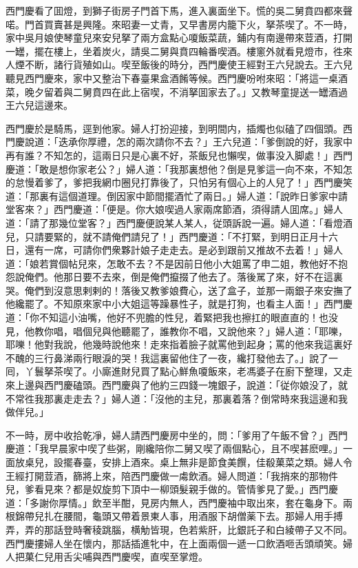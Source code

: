 西門慶看了囬燈，到獅子街房子門首下馬，進入裏面坐下。慌的吳二舅賁四都來聲喏。門首買賣甚是興隆。來昭妻一丈青，又早書房内籠下火，拏茶喫了。不一時，家中吳月娘使琴童兒來安兒拏了兩方盒點心嗄飯菜蔬，鋪内有南邊帶來荳酒，打開一罎，擺在樓上，坐着炭火，請吳二舅與賁四輪番喫酒。樓窻外就看見燈巿，徃來人煙不断，諸行貨殖如山。喫至飯後的時分，西門慶使王經對王六兒說去。王六兒聽見西門慶來，家中又整治下春臺果盒酒餚等候。西門慶吩咐來昭：「將這一桌酒菜，晚夕留着與二舅賁四在此上宿喫，不消拏囬家去了。」又教琴童提送一罎酒過王六兒這邊來。

西門慶於是騎馬，逕到他家。婦人打扮迎接，到明間内，插燭也似磕了四個頭。西門慶說道：「迭承你厚禮，怎的兩次請你不去？」王六兒道：「爹倒說的好，我家中再有誰？不知怎的，這兩日只是心裏不好，茶飯兒也懶喫，做事没入脚處！」西門慶道：「敢是想你家老公？」婦人道：「我那裏想他？倒是見爹這一向不來，不知怎的怠慢着爹了，爹把我網巾圈兒打靠後了，只怕另有個心上的人兒了！」西門慶笑道：「那裏有這個道理。倒因家中節間擺酒忙了兩日。」婦人道：「說昨日爹家中請堂客來？」西門慶道：「便是。你大娘喫過人家兩席節酒，須得請人囬席。」婦人道：「請了那幾位堂客？」西門慶便說某人某人，従頭訴說一遍。婦人道：「看燈酒兒，只請要緊的，就不請俺們請兒了！」西門慶道：「不打緊，到明日正月十六日，還有一席，可請你們衆夥計娘子走走去。是必到跟前又推故不去着！」婦人道：「娘若賞個帖兒來，怎敢不去？不是因前日他小大姐罵了申二姐，教他好不抱怨說俺們。他那日要不去來，倒是俺們攛掇了他去了。落後駡了來，好不在這裏哭。俺們到沒意思剌剌的！落後又教爹娘費心，送了盒子，並那一兩銀子來安撫了他纔罷了。不知原來家中小大姐這等躁暴性子，就是打狗，也看主人面！」西門慶道：「你不知這小油嘴，他好不兜膽的性兒，着緊把我也擦扛的眼直直的！也没見，他教你唱，唱個兒與他聽罷了，誰教你不唱，又說他來？」婦人道：「耶嚛，耶嚛！他對我說，他幾時說他來！走來指着臉子就罵他到起身；罵的他來我這裏好不醜的三行鼻涕兩行眼淚的哭！我這裏留他住了一夜，纔打發他去了。」說了一囘，丫鬟拏茶喫了。小廝進財兒買了點心鮮魚嗄飯來，老馮婆子在廚下整理，又走來上邊與西門慶磕頭。西門慶與了他約三四錢一塊銀子，說道：「従你娘没了，就不常徃我那裏走走去？」婦人道：「沒他的主兒，那裏着落？倒常時來我這邊和我做伴兒。」

不一時，房中收拾乾凈，婦人請西門慶房中坐的，問：「爹用了午飯不曾？」西門慶道：「我早晨家中喫了些粥，剛纔陪你二舅又喫了兩個點心，且不喫甚麽哩。」一面放桌兒，設擺春臺，安排上酒來。桌上無非是節食美饌，佳殽菓菜之類。婦人令王經打開荳酒，篩將上來，陪西門慶做一䖏飲酒。婦人問道：「我捎來的那物件兒，爹看見來？都是奴旋剪下頂中一柳頭髮親手做的。管情爹見了愛。」西門慶道：「多謝你厚情。」飲至半酣，見房内無人，西門慶袖中取出來，套在龜身下。兩根錦帶兒扎在腰間，龜頭又帶着景東人事，用酒服下胡僧薬下去。那婦人用手搏弄，弄的那話登時奢稜跳腦，横觔皆現，色若紫肝，比銀託子和白綾帶子又不同。西門慶摟婦人坐在懷内，那話插進牝中，在上面兩個一遞一口飲酒咂舌頭頑笑。婦人把菓仁兒用舌尖哺與西門慶喫，直喫至掌燈。

